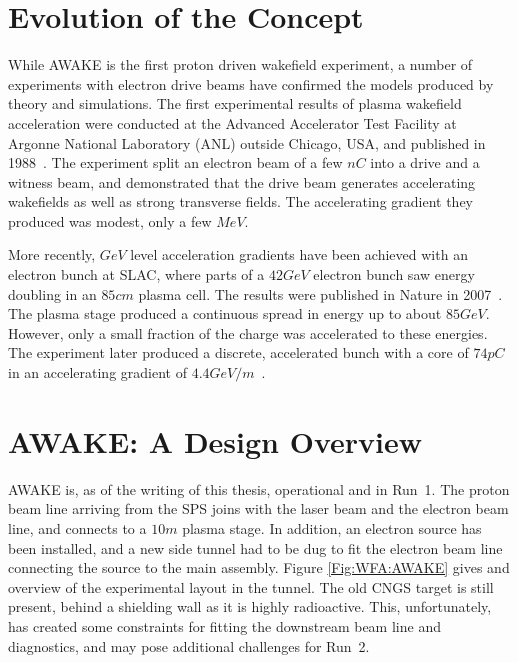 \section{Evolution of the Concept}
\label{WFA:History}

While AWAKE is the first proton driven wakefield experiment, a number of experiments with electron drive beams have confirmed the models produced by theory and simulations.
The first experimental results of plasma wakefield acceleration were conducted at the Advanced Accelerator Test Facility at Argonne National Laboratory (ANL) outside Chicago, USA, and published in 1988~\cite{rosenzweig:1988}.
The experiment split an electron beam of a few $\unit{nC}$ into a drive and a witness beam, and demonstrated that the drive beam generates accelerating wakefields as well as strong transverse fields. The accelerating gradient they produced was modest, only a few $\unit{MeV}$.

More recently, $\unit{GeV}$ level acceleration gradients have been achieved with an electron bunch at SLAC, where parts of a $42\unit{GeV}$ electron bunch saw energy doubling in an $85\unit{cm}$ plasma cell.
The results were published in Nature in 2007~\cite{blumenfeld:2007}.
The plasma stage produced a continuous spread in energy up to about $85\unit{GeV}$.
However, only a small fraction of the charge was accelerated to these energies.
The experiment later produced a discrete, accelerated bunch with a core of $74\unit{pC}$ in an accelerating gradient of $4.4\unit{GeV/m}$~\cite{litos:2014}.


\section{AWAKE: A Design Overview}
\label{WFA:Design}

AWAKE is, as of the writing of this thesis, operational and in Run~1.
The proton beam line arriving from the SPS joins with the laser beam and the electron beam line, and connects to a $10\unit{m}$ plasma stage.
In addition, an electron source has been installed, and a new side tunnel had to be dug to fit the electron beam line connecting the source to the main assembly.
Figure \ref{Fig:WFA:AWAKE} gives and overview of the experimental layout in the tunnel.
The old CNGS target is still present, behind a shielding wall as it is highly radioactive.
This, unfortunately, has created some constraints for fitting the downstream beam line and diagnostics, and may pose additional challenges for Run~2.

